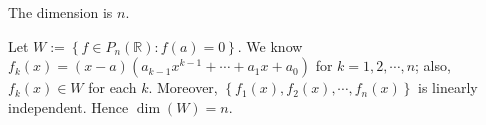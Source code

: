 \begin{Exercise}
\begin{answer}
The dimension is $n$.
\end{answer}
\begin{solution}
Let $W := \left\{ f\in P_n(\mathbb{R}): f(a) = 0 \right\}$. We know $f_k(x) = (x-a)(a_{k-1}x^{k-1}+\cdots+a_1 x+a_0)$ for $k=1,2,\cdots,n$; also, $f_k(x)\in W$ for each $k$. Moreover, $\left\{ f_1(x), f_2(x), \cdots, f_n(x) \right\}$ is linearly independent. Hence $\dim(W) = n$.
\end{solution}
\end{Exercise}